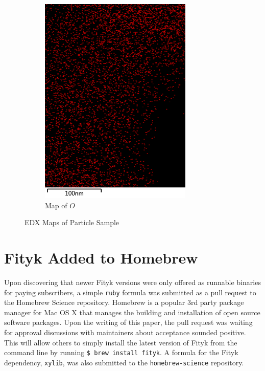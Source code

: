 \documentclass[12pt,a4paper]{article}
\begin{document}
\begin{figure}[htbp]
\begin{subfigure}[b]{0.35\textwidth}
    \includegraphics[width=\textwidth]{Data/O Map.png}
    \caption{Map of $O$}
    \label{fig:o_map}
  \end{subfigure}
  \caption{EDX Maps of Particle Sample}\label{fig:map_grid}
\end{figure}



\section{Fityk Added to Homebrew} %
\label{sec:fityk_homebrew}

Upon discovering that newer Fityk versions were only offered as runnable binaries for paying subscribers, a simple \texttt{ruby} formula was submitted as a pull request to the Homebrew Science repository.  Homebrew is a popular 3rd party package manager for Mac OS X that manages the building and installation of open source software packages.  Upon the writing of this paper, the pull request was waiting for approval discussions with maintainers about acceptance sounded positive.  This will allow others to simply install the latest version of Fityk from the command line by running \texttt{\$ brew install fityk}.  A formula for the Fityk dependency, \texttt{xylib}, was also submitted to the \texttt{homebrew-science} repository.
\end{document}
